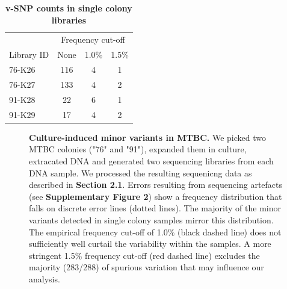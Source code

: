 \documentclass[12pt, oneside]{article}   	%
\begin{document}
\begin{table}[htbp]
   \centering
   \caption*{\textbf{v-SNP counts in single colony libraries}}
   \begin{tabular}{@{} lccc @{}} %
      \toprule
       & \multicolumn{3}{c}{Frequency cut-off}\\
      \cmidrule(lr){2-4}
      Library ID & None & 1.0\% & 1.5\% \\
      \midrule
      76-K26 & 116 & 4 & 1\\
      76-K27 & 133 & 4 & 2\\
      91-K28 & 22 & 6 & 1\\
      91-K29 & 17 & 4 & 2\\
      \bottomrule
   \end{tabular}
   \label{tab:SingCvSNP}
\end{table}

\begin{figure}
\centering
{}
\label{fig:supfig3}
\caption{\textbf{Culture-induced minor variants in MTBC.} We picked two MTBC colonies ("76" and "91"), expanded them in culture, extracated DNA and generated two sequencing libraries from each DNA sample. We processed the resulting sequenicng data as described in \textbf{Section 2.1}. Errors resulting from sequencing artefacts (see \textbf{Supplementary Figure 2}) show a frequency distribution that falls on discrete error lines (dotted lines). The majority of the minor variants detected in single colony samples mirror this distribution. The empirical frequency cut-off of 1.0\% (black dashed line) does not sufficiently well curtail the variability within the samples. A more stringent 1.5\% frequency cut-off (red dashed line) excludes the majority (283/288) of spurious variation that may influence our analysis.}
\end{figure}
\end{document}
